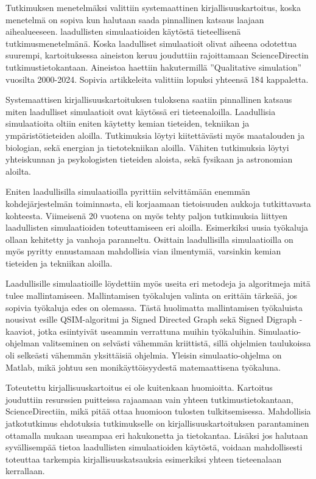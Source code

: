 \documentclass[utf8]{gradu3}
\begin{document}
Tutkimuksen menetelmäksi valittiin systemaattinen kirjallisuuskartoitus, koska
menetelmä on sopiva kun halutaan saada pinnallinen katsaus laajaan aihealueeseen.
laadullisten simulaatioiden käytöstä tieteellisenä tutkimusmenetelmänä.
Koska laadulliset simulaatioit olivat aiheena odotettua suurempi, 
kartoituksessa aineiston keruu jouduttiin rajoittamaan ScienceDirectin 
tutkimustietokantaan. Aineistoa haettiin hakutermillä ''Qualitative simulation''
vuosilta 2000-2024. Sopivia artikkeleita valittiin lopuksi yhteensä 184 kappaletta.

Systemaattisen kirjallisuuskartoituksen tuloksena saatiin pinnallinen katsaus miten 
laadulliset simulaatioit ovat käytössä eri tieteenaloilla. 
Laadullisia simulaatioita oltiin eniten käytetty kemian tieteiden, 
tekniikan ja ympäristötieteiden aloilla. Tutkimuksia löytyi kiitettävästi myös
maatalouden ja biologian, sekä energian ja tietotekniikan aloilla. 
Vähiten tutkimuksia löytyi yhteiskunnan ja psykologisten tieteiden aloista, sekä 
fysikaan ja astronomian aloilta.

Eniten laadullisilla simulaatioilla pyrittiin
selvittämään enemmän kohdejärjestelmän toiminnasta, eli korjaamaan tietoisuuden aukkoja
tutkittavasta kohteesta. Viimeisenä 20 vuotena on myös tehty paljon tutkimuksia liittyen 
laadullisten simulaatioiden toteuttamiseen eri aloilla. 
Esimerkiksi uusia työkaluja ollaan kehitetty ja vanhoja paranneltu.
Osittain laadullisilla simulaatioilla on myös pyritty ennustamaan mahdollisia vian 
ilmentymiä, varsinkin kemian tieteiden ja tekniikan aloilla.

Laadullisille simulaatioille löydettiin myös useita eri metodeja ja algoritmeja 
mitä tulee mallintamiseen. Mallintamisen työkalujen valinta on erittäin tärkeää,
jos sopivia työkaluja edes on olemassa. Tästä huolimatta mallintamisen työkaluista
nousivat esille QSIM-algoritmi ja Signed Directed Graph sekä Signed Digraph -kaaviot, 
jotka esiintyivät useammin verrattuna muihin työkaluihin.
Simulaatio-ohjelman valitseminen on selvästi vähemmän kriittistä, sillä ohjelmien taulukoissa
oli selkeästi vähemmän yksittäisiä ohjelmia. 
Yleisin simulaatio-ohjelma on Matlab, mikä johtuu sen monikäyttöisyydestä 
matemaattisena työkaluna.

Toteutettu kirjallisuuskartoitus ei ole kuitenkaan huomioitta. Kartoitus jouduttiin resurssien
puitteissa rajaamaan vain yhteen tutkimustietokantaan, ScienceDirectiin, 
mikä pitää ottaa huomioon tulosten tulkitsemisessa. Mahdollisia jatkotutkimus ehdotuksia
tutkimukselle on kirjallisuuskartoituksen parantaminen ottamalla mukaan useampaa eri 
hakukonetta ja tietokantaa. 
Lisäksi jos halutaan syvällisempää tietoa laadullisten simulaatioiden käytöstä, 
voidaan mahdollisesti toteuttaa tarkempia kirjallisuuskatsauksia esimerkiksi yhteen 
tieteenalaan kerrallaan.
\end{document}
